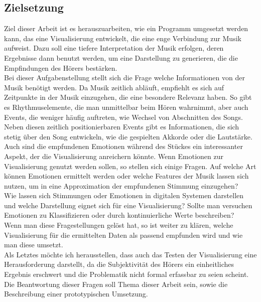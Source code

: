 \documentclass[11pt,a4paper]{article}
\begin{document}
\subsection{Zielsetzung}
Ziel dieser Arbeit ist es herauszuarbeiten, wie ein Programm umgesetzt werden kann, das eine Visualisierung entwickelt, die eine enge Verbindung zur Musik aufweist. Dazu soll eine tiefere Interpretation der Musik erfolgen, deren Ergebnisse dann benutzt werden, um eine Darstellung zu generieren, die die Empfindungen des Hörers bestärken.\\
Bei dieser Aufgabenstellung stellt sich die Frage welche Informationen von der Musik benötigt werden. Da Musik zeitlich abläuft, empfiehlt es sich auf Zeitpunkte in der Musik einzugehen, die eine besondere Relevanz haben. So gibt es Rhythmuselemente, die man unmittelbar beim Hören wahrnimmt, aber auch Events, die weniger häufig auftreten, wie Wechsel von Abschnitten des Songs. Neben diesen zeitlich positionierbaren Events gibt es Informationen, die sich stetig über den Song entwickeln, wie die gespielten Akkorde oder die Lautstärke.\\
Auch sind die empfundenen Emotionen während des Stückes ein interessanter Aspekt, der die Visualisierung anreichern könnte.
Wenn Emotionen zur Visualisierung genutzt werden sollen, so stellen sich einige Fragen. Auf welche Art können Emotionen ermittelt werden oder welche Features der Musik lassen sich nutzen, um in eine Approximation der empfundenen Stimmung einzugehen?\\
Wie lassen sich Stimmungen oder Emotionen in digitalen Systemen darstellen und welche Darstellung eignet sich für eine Visualisierung? Sollte man versuchen Emotionen zu Klassifizieren oder durch kontinuierliche Werte beschreiben?\\
Wenn man diese Fragestellungen gelöst hat, so ist weiter zu klären, welche Visualisierung für die ermittelten Daten als passend empfunden wird und wie man diese umsetzt.\\
Als Letztes möchte ich herausstellen, dass auch das Testen der Visualisierung eine Herausforderung darstellt, da die Subjektivität des Hörers ein einheitliches Ergebnis erschwert und die Problematik nicht formal erfassbar zu seien scheint. Die Beantwortung dieser Fragen soll Thema dieser Arbeit sein, sowie die Beschreibung einer prototypischen Umsetzung. 
\end{document}
